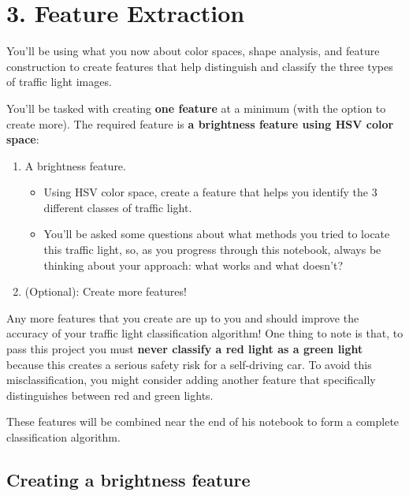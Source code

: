 \documentclass[11pt]{article}
\providecommand{\tightlist}{%
      \setlength{\itemsep}{0pt}\setlength{\parskip}{0pt}}
\begin{document}
    \hypertarget{feature-extraction}{%
\section{3. Feature Extraction}\label{feature-extraction}}

You'll be using what you now about color spaces, shape analysis, and
feature construction to create features that help distinguish and
classify the three types of traffic light images.

You'll be tasked with creating \textbf{one feature} at a minimum (with
the option to create more). The required feature is \textbf{a brightness
feature using HSV color space}:

\begin{enumerate}
\def\labelenumi{\arabic{enumi}.}
\tightlist
\item
  A brightness feature.

  \begin{itemize}
  \tightlist
  \item
    Using HSV color space, create a feature that helps you identify the
    3 different classes of traffic light.
  \item
    You'll be asked some questions about what methods you tried to
    locate this traffic light, so, as you progress through this
    notebook, always be thinking about your approach: what works and
    what doesn't?
  \end{itemize}
\item
  (Optional): Create more features!
\end{enumerate}

Any more features that you create are up to you and should improve the
accuracy of your traffic light classification algorithm! One thing to
note is that, to pass this project you must \textbf{never classify a red
light as a green light} because this creates a serious safety risk for a
self-driving car. To avoid this misclassification, you might consider
adding another feature that specifically distinguishes between red and
green lights.

These features will be combined near the end of his notebook to form a
complete classification algorithm.

    \hypertarget{creating-a-brightness-feature}{%
\subsection{Creating a brightness
feature}\label{creating-a-brightness-feature}}
\end{document}
